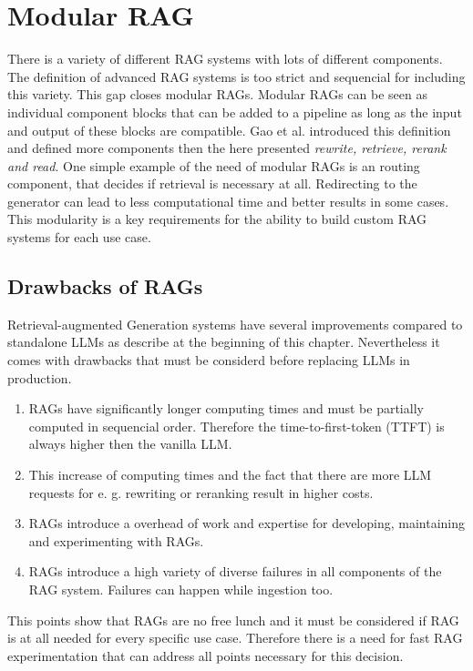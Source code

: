 \section{Modular RAG}

There is a variety of different RAG systems with lots of different components. The definition of advanced RAG systems is too strict and sequencial for including this variety. This gap closes modular RAGs. Modular RAGs can be seen as individual component blocks that can be added to a pipeline as long as the input and output of these blocks are compatible. Gao et al. introduced this definition and defined more components then the here presented \textit{rewrite, retrieve, rerank and read}.\cite{Gao.18.12.2023} One simple example of the need of modular RAGs is an routing component, that decides if retrieval is necessary at all. Redirecting to the generator can lead to less computational time and better results in some cases.\cite{Mallen.20.12.2022} This modularity is a key requirements for the ability to build custom RAG systems for each use case.




\subsection{Drawbacks of RAGs}
\label{sec:drawbacks}
Retrieval-augmented Generation systems have several improvements compared to standalone LLMs as describe at the beginning of this chapter. Nevertheless it comes with drawbacks that must be considerd before replacing LLMs in production. 

\begin{enumerate}
    \item RAGs have significantly longer computing times and must be partially computed in sequencial order. Therefore the time-to-first-token (TTFT) is always higher then the vanilla LLM. 
    \item This increase of computing times and the fact that there are more LLM requests for e. g. rewriting or reranking result in higher costs.
    \item RAGs introduce a overhead of work and expertise for developing, maintaining and experimenting with RAGs.
    \item RAGs introduce a high variety of diverse failures in all components of the RAG system. Failures can happen while ingestion too.\\[9pt]
\end{enumerate}

This points show that RAGs are no free lunch and it must be considered if RAG is at all needed for every specific use case. Therefore there is a need for fast RAG experimentation that can address all points necessary for this decision.
